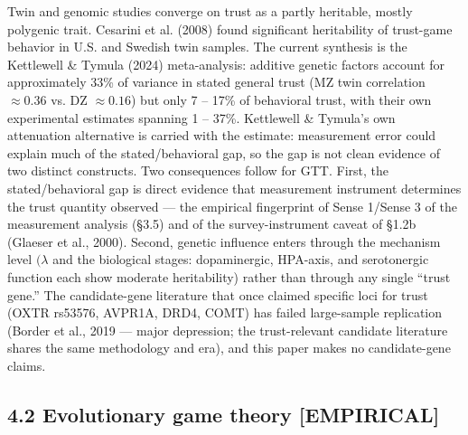 \documentclass[11pt,twocolumn]{article}
\theoremstyle{gttdef}
\theoremstyle{gttplain}
\begin{document}
Twin and genomic studies converge on trust as a partly heritable, mostly polygenic trait. Cesarini et al. (2008) found significant heritability of trust-game behavior in U.S. and Swedish twin samples. The current synthesis is the Kettlewell \& Tymula (2024) meta-analysis: additive genetic factors account for approximately 33\% of variance in stated general trust (MZ twin correlation $\approx 0.36$ vs. DZ $\approx 0.16$) but only 7 -- 17\% of behavioral trust, with their own experimental estimates spanning 1 -- 37\%. Kettlewell \& Tymula's own attenuation alternative is carried with the estimate: measurement error could explain much of the stated/behavioral gap, so the gap is not clean evidence of two distinct constructs. Two consequences follow for GTT. First, the stated/behavioral gap is direct evidence that measurement instrument determines the trust quantity observed --- the empirical fingerprint of Sense 1/Sense 3 of the measurement analysis (\S{}3.5) and of the survey-instrument caveat of \S{}1.2b (Glaeser et al., 2000). Second, genetic influence enters through the mechanism level $(\lambda$ and the biological stages: dopaminergic, HPA-axis, and serotonergic function each show moderate heritability) rather than through any single ``trust gene.'' The candidate-gene literature that once claimed specific loci for trust (OXTR rs53576, AVPR1A, DRD4, COMT) has failed large-sample replication (Border et al., 2019 --- major depression; the trust-relevant candidate literature shares the same methodology and era), and this paper makes no candidate-gene claims.

\subsection*{4.2 Evolutionary game theory [EMPIRICAL]}
\end{document}
